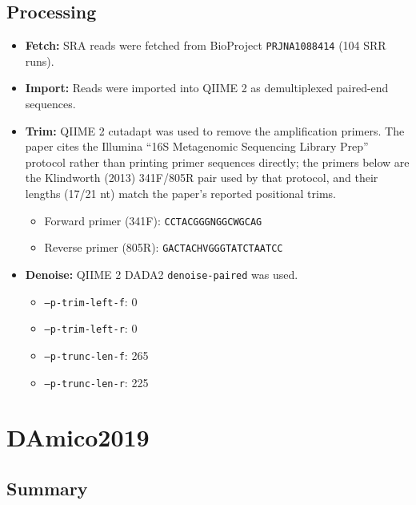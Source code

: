 \documentclass[11pt,a4paper]{article}
\begin{document}
\subsection{Processing}
\begin{itemize}
\item \textbf{Fetch:} SRA reads were fetched from BioProject \texttt{PRJNA1088414} (104 SRR runs).
\item \textbf{Import:} Reads were imported into QIIME 2 as demultiplexed paired-end sequences.
\item \textbf{Trim:} QIIME 2 cutadapt was used to remove the amplification primers. The paper cites the Illumina ``16S Metagenomic Sequencing Library Prep'' protocol rather than printing primer sequences directly; the primers below are the Klindworth (2013) 341F/805R pair used by that protocol, and their lengths (17/21 nt) match the paper's reported positional trims.
  \begin{itemize}
  \item Forward primer (341F): \texttt{CCTACGGGNGGCWGCAG}
  \item Reverse primer (805R): \texttt{GACTACHVGGGTATCTAATCC}
  \end{itemize}
\item \textbf{Denoise:} QIIME 2 DADA2 \texttt{denoise-paired} was used.
  \begin{itemize}
  \item \texttt{--p-trim-left-f}: 0
  \item \texttt{--p-trim-left-r}: 0
  \item \texttt{--p-trunc-len-f}: 265
  \item \texttt{--p-trunc-len-r}: 225
  \end{itemize}
\end{itemize}


\section{DAmico2019}
\subsection{Summary}
\end{document}
